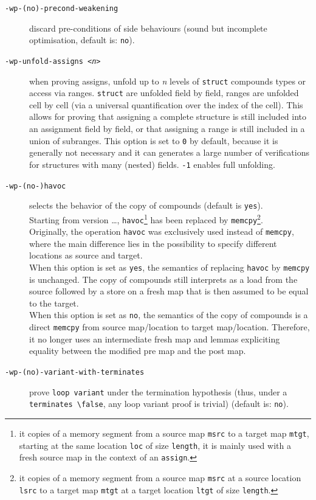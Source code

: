\begin{description}
\item[\tt -wp-(no)-precond-weakening] discard pre-conditions of side behaviours (sound but
  incomplete optimisation, default is: \texttt{no}).
\item[\tt -wp-unfold-assigns <{\it n}>] when proving assigns, unfold up to
  \textit{n} levels of \texttt{struct} compounds types or access via ranges.
  \texttt{struct} are unfolded field by field, ranges are unfolded cell by
  cell (via a universal quantification over the index of the cell).
  This allows for proving that assigning a complete structure is still included
  into an assignment field by field, or that assigning a range is still included
  in a union of subranges. This option is set to \texttt{0} by default, because
  it is generally not necessary and it can generates a large number of
  verifications for structures with many (nested) fields. \texttt{-1} enables
  full unfolding.
\item[\tt -wp-(no-)havoc] selects the behavior of the copy of compounds (default is \texttt{yes}).\\
  Starting from version \dots, \texttt{havoc}\footnote{it copies of a memory
  segment from a source map \texttt{msrc} to a target map \texttt{mtgt},
  starting at the same location \texttt{loc} of size \texttt{length}, it is
  mainly used with a fresh source map in the context of an \texttt{assign}.}
  has been replaced by \texttt{memcpy}\footnote{it copies of a memory segment
  from a source map \texttt{msrc} at a source location \texttt{lsrc} to a target
  map \texttt{mtgt} at a target location \texttt{ltgt} of size \texttt{length}.}.\\
  Originally, the operation \texttt{havoc} was exclusively used instead of
  \texttt{memcpy}, where the main difference lies in the possibility to
  specify different locations as source and target.\\
  When this option is set as \texttt{yes}, the semantics of replacing \texttt{havoc}
  by \texttt{memcpy} is unchanged. The copy of compounds still interprets as a
  load from the source followed by a store on a fresh map that is then assumed
  to be equal to the target. \\
  When this option is set as \texttt{no}, the semantics of the copy of compounds
  is a direct \texttt{memcpy} from source map/location to target map/location.
  Therefore, it no longer uses an intermediate fresh map and lemmas expliciting
  equality between the modified pre map and the post map.


\item[\tt -wp-(no)-variant-with-terminates] prove \texttt{loop variant} under
  the termination hypothesis (thus, under a
  \texttt{terminates \textbackslash{}false}, any loop variant proof is trivial)
  (default is: \texttt{no}).
\end{description}

